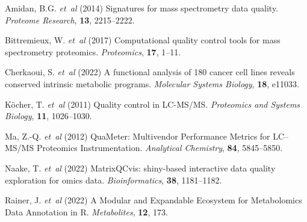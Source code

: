 \documentclass{bioinfo}
\begin{document}
\begin{thebibliography}{}

Amidan, B.G. \textit{et~al} (2014) Signatures for mass spectrometry data
quality.
\textit{Proteome Research}, \textbf{13}, 2215--2222.


Bittremieux, W. \textit{et~al} (2017) Computational quality control tools for
mass spectrometry proteomics.
\textit{Proteomics}, \textbf{17}, 1--11.

Cherkaoui, S. \textit{et~al} (2022) A functional analysis of 180 cancer cell
lines reveals conserved intrinsic metabolic programs.
\textit{Molecular Systems Biology}, \textbf{18}, e11033.

K\"ocher, T. \textit{et~al} (2011) Quality control in LC-MS/MS.
\textit{Proteomics and Systems Biology}, \textbf{11}, 1026--1030.


Ma, Z.-Q. \textit{et~al} (2012) QuaMeter: Multivendor Performance Metrics
for LC–MS/MS Proteomics Instrumentation.
\textit{Analytical Chemistry}, \textbf{84}, 5845--5850.

Naake, T. \textit{et~al} (2022) MatrixQCvis: shiny-based interactive data
quality exploration for omics data.
\textit{Bioinformatics}, \textbf{38}, 1181--1182.

Rainer, J. \textit{et~al} (2022) A Modular and Expandable Ecosystem for Metabolomics Data Annotation in R.
\textit{Metabolites}, \textbf{12}, 173.

\end{thebibliography}


%
%
%
%
%

%


\end{document}
